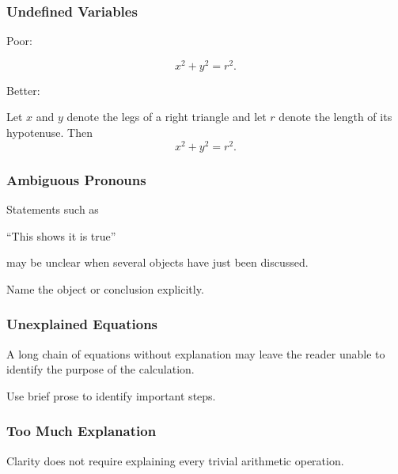 \subsubsection{Undefined Variables}

Poor:

\[ x^2+y^2=r^2. \]

Better:

\begin{center}
Let \(x\) and \(y\) denote the legs of a right triangle and let \(r\) denote
the length of its hypotenuse. Then
\[ x^2+y^2=r^2. \]
\end{center}

\subsubsection{Ambiguous Pronouns}
\label{subsec:ambiguous-pronouns}

Statements such as

\begin{center}
``This shows it is true''
\end{center}

may be unclear when several objects have just been discussed.

Name the object or conclusion explicitly.

\subsubsection{Unexplained Equations}
\label{subsec:unexplained-equations}

A long chain of equations without explanation may leave the reader unable to
identify the purpose of the calculation.

Use brief prose to identify important steps.

\subsubsection{Too Much Explanation}
\label{subsec:too-much-explanation}

Clarity does not require explaining every trivial arithmetic operation.

